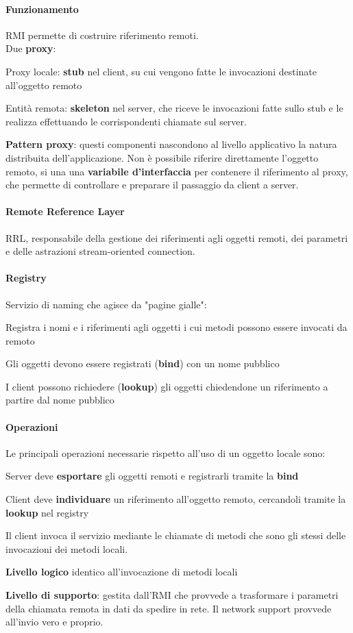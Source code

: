 \documentclass[10pt]{article}
\begin{document}
\paragraph{Funzionamento} RMI permette di costruire riferimento remoti.\\
Due \textbf{proxy}: \begin{list}{}{}
	\item Proxy locale: \textbf{stub} nel client, su cui vengono fatte le invocazioni destinate all'oggetto remoto
	\item Entità remota: \textbf{skeleton} nel server, che riceve le invocazioni fatte sullo stub e le realizza effettuando le corrispondenti chiamate sul server.
\end{list}
\textbf{Pattern proxy}: questi componenti nascondono al livello applicativo la natura distribuita dell'applicazione. Non è possibile riferire direttamente l'oggetto remoto, si una una \textbf{variabile d'interfaccia} per contenere il riferimento al proxy, che permette di controllare e preparare il passaggio da client a server.
\paragraph{Remote Reference Layer} RRL, responsabile della gestione dei riferimenti agli oggetti remoti, dei parametri e delle astrazioni stream-oriented connection.
\paragraph{Registry} Servizio di naming che agisce da "pagine gialle":
\begin{list}{}{}
	\item Registra i nomi e i riferimenti agli oggetti i cui metodi possono essere invocati da remoto
	\item Gli oggetti devono essere registrati (\textbf{bind}) con un nome pubblico
	\item I client possono richiedere (\textbf{lookup}) gli oggetti chiedendone un riferimento a partire dal nome pubblico
\end{list}
\paragraph{Operazioni} Le principali operazioni necessarie rispetto all'uso di un oggetto locale sono:
\begin{list}{}{}
	\item Server deve \textbf{esportare} gli oggetti remoti e registrarli tramite la \textbf{bind}
	\item Client deve \textbf{individuare} un riferimento all'oggetto remoto, cercandoli tramite la \textbf{lookup} nel registry
	\item Il client invoca il servizio mediante le chiamate di metodi che sono gli stessi delle invocazioni dei metodi locali.
	\item \textbf{Livello logico} identico all'invocazione di metodi locali
	\item \textbf{Livello di supporto}: gestita dall'RMI che provvede a trasformare i parametri della chiamata remota in dati da spedire in rete. Il network support provvede all'invio vero e proprio.
\end{list}
\end{document}
